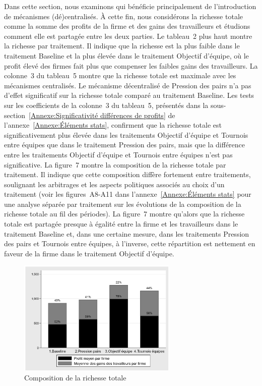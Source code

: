 \begin{Article}
\begin{refsection}[Lebourges]
Dans cette section, nous examinons qui bénéficie principalement de
l'introduction de mécanismes (dé)centralisés. À cette fin, nous
considérons la richesse totale comme la somme des profits de la firme et
des gains des travailleurs et étudions comment elle est partagée entre
les deux parties.
Le tableau~2 plus haut montre la richesse par traitement. Il indique que
la richesse est la plus faible dans le traitement Baseline et la plus
élevée dans le traitement Objectif d'équipe, où le profit élevé des
firmes fait plus que compenser les faibles gains des travailleurs.
La colonne~3 du tableau~5 montre que la richesse totale est maximale
avec les mécanismes centralisés. Le mécanisme décentralisé de Pression
des pairs n'a pas d'effet significatif sur la richesse totale comparé au
traitement Baseline. Les tests sur les coefficients de la colonne~3 du
tableau~5, présentés dans la sous-section~\ref{Annexe:Significativité différences de profits} de l'annexe~\ref{Annexe:Éléments stats}, confirment que la richesse totale est significativement plus élevée dans
les traitements Objectif d'équipe et Tournois entre équipes que dans le
traitement Pression des pairs, mais que la différence entre les
traitements Objectif d'équipe et Tournois entre équipes n'est pas
significative.
La figure~7 montre la composition de la richesse totale par
traitement. Il indique que cette composition diffère fortement entre
traitements, soulignant les arbitrages et les aspects politiques
associés au choix d'un traitement (voir les figures~A8-A11 dans
l'annexe~\ref{Annexe:Éléments stats} pour une analyse séparée par traitement sur les évolutions de la composition de la richesse totale au fil des périodes). La
figure~7 montre qu'alors que la richesse totale est partagée presque
à égalité entre la firme et les travailleurs dans le traitement Baseline
et, dans une certaine mesure, dans les traitements Pression des pairs et
Tournois entre équipes, à l'inverse, cette répartition est nettement en
faveur de la firme dans le traitement Objectif d'équipe.

\begin{figure}[h]
    \centering
    \caption{Composition de la richesse totale}
    \includegraphics[height=5.5cm]{05_graph7.png}
\end{figure}


\end{refsection}
\end{Article}
